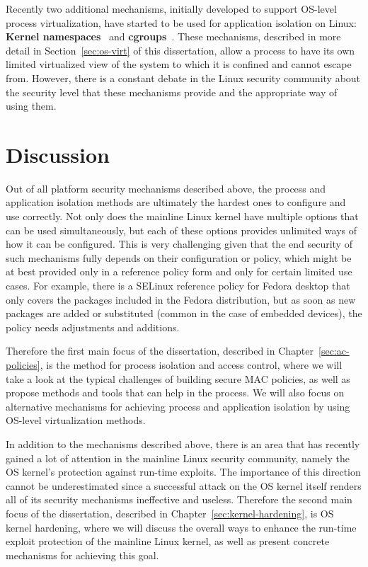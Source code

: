 Recently two additional mechanisms, initially developed to support OS-level process virtualization, have started to be used for application isolation on Linux: \textbf{Kernel namespaces}~\cite{biederman2006} and \textbf{cgroups}~\cite{cgroupsv2}. These mechanisms, described in more detail in Section~\ref{sec:os-virt} of this dissertation, allow a process to have its own limited virtualized view of the system to which it is confined and cannot escape from. However, there is a constant debate in the Linux security community about the security level that these mechanisms provide and the appropriate way of using them.   

\section{Discussion}

Out of all platform security mechanisms described above, the process and application isolation methods are ultimately the hardest ones to configure and use correctly. Not only does the mainline Linux kernel have multiple options that can be used simultaneously, but each of these options provides unlimited ways of how it can be configured. This is very challenging given that the end security of such mechanisms fully depends on their configuration or policy, which might be at best provided only in a reference policy form and only for certain limited use cases. For example, there is a SELinux reference policy for Fedora desktop that only covers the packages included in the Fedora distribution, but as soon as new packages are added or substituted (common in the case of embedded devices), the policy needs adjustments and additions. 

Therefore the first main focus of the dissertation, described in Chapter~\ref{sec:ac-policies}, is the method for process isolation and access control, where we will take a look at the typical challenges of building secure MAC policies, as well as propose methods and tools that can help in the process. We will also focus on alternative mechanisms for achieving process and application isolation by using OS-level virtualization methods. 

In addition to the mechanisms described above, there is an area that has recently gained a lot of attention in the mainline Linux security community, namely the OS kernel's protection against run-time exploits. The importance of this direction cannot be underestimated since a successful attack on the OS kernel itself renders all of its security mechanisms ineffective and useless. Therefore the second main focus of the dissertation, described in Chapter~\ref{sec:kernel-hardening}, is OS kernel hardening, where we will discuss the overall ways to enhance the run-time exploit protection of the mainline Linux kernel, as well as present concrete mechanisms for achieving this goal. 
 